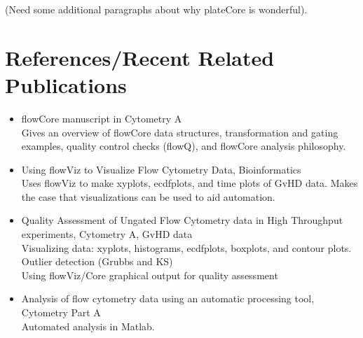 \documentclass[12pt]{article}
\begin{document}
(Need some additional paragraphs about why plateCore is wonderful).

\section*{References/Recent Related Publications}
\begin{itemize}
\item flowCore manuscript in Cytometry A\\
Gives an overview of flowCore data structures, transformation and gating examples, quality control checks (flowQ), and 
flowCore analysis philosophy.\\
\item Using flowViz to Visualize Flow Cytometry Data, Bioinformatics\\
Uses flowViz to make xyplots, ecdfplots, and time plots of GvHD data. Makes the case that visualizations can be used to aid automation.
\item Quality Assessment of Ungated Flow Cytometry data in High Throughput experiments, Cytometry A, GvHD data\\
Visualizing data: xyplots, histograms, ecdfplots, boxplots, and contour plots.\\
Outlier detection (Grubbs and KS)\\
Using flowViz/Core graphical output for quality assessment\\
\item Analysis of flow cytometry data using an automatic processing tool, Cytometry Part A\\
Automated analysis in Matlab.\\
\end{itemize}
\end{document}
